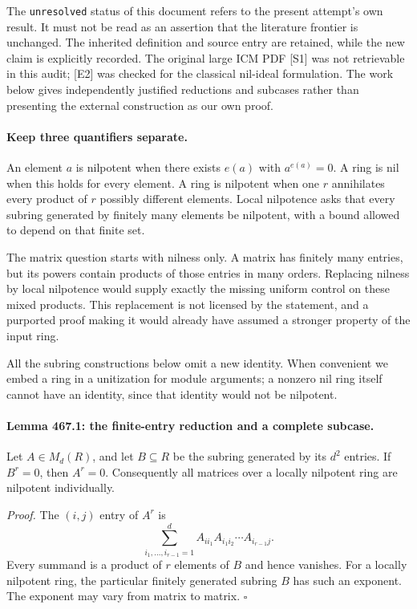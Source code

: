 \documentclass[11pt]{article}
\begin{document}
The \texttt{unresolved} status of this document refers to the present
attempt's own result. It must not be read as an assertion that the
literature frontier is unchanged. The inherited definition and source
entry are retained, while the new claim is explicitly recorded. The
original large ICM PDF [S1] was not retrievable in this audit; [E2] was
checked for the classical nil-ideal formulation. The work below gives
independently justified reductions and subcases rather than presenting
the external construction as our own proof.

\paragraph{Keep three quantifiers separate.}
An element $a$ is nilpotent when there exists $e(a)$ with $a^{e(a)}=0$.
A ring is nil when this holds for every element. A ring is nilpotent when
one $r$ annihilates every product of $r$ possibly different elements.
Local nilpotence asks that every subring generated by finitely many elements
be nilpotent, with a bound allowed to depend on that finite set.

The matrix question starts with nilness only. A matrix has finitely many
entries, but its powers contain products of those entries in many orders.
Replacing nilness by local nilpotence would supply exactly the missing
uniform control on these mixed products. This replacement is not licensed
by the statement, and a purported proof making it would already have
assumed a stronger property of the input ring.

All the subring constructions below omit a new identity. When convenient
we embed a ring in a unitization for module arguments; a nonzero nil ring
itself cannot have an identity, since that identity would not be nilpotent.

\paragraph{Lemma 467.1: the finite-entry reduction and a complete subcase.}
Let $A\in M_d(R)$, and let $B\subseteq R$ be the subring generated by
its $d^2$ entries. If $B^r=0$, then $A^r=0$. Consequently all matrices
over a locally nilpotent ring are nilpotent individually.

\emph{Proof.} The $(i,j)$ entry of $A^r$ is
\[
 \sum_{i_1,\ldots,i_{r-1}=1}^d
 A_{ii_1}A_{i_1i_2}\cdots A_{i_{r-1}j}.
\]
Every summand is a product of $r$ elements of $B$ and hence vanishes.
For a locally nilpotent ring, the particular finitely generated subring
$B$ has such an exponent. The exponent may vary from matrix to matrix.
\hfill$\square$
\end{document}
